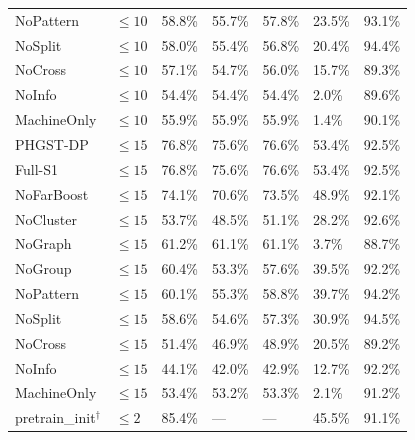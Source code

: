 \begin{table}[p]
\begin{tabularx}{\textwidth}{@{}lXXXXXX@{}}
NoPattern & $\le 10$ & 58.8\% & 55.7\% & 57.8\% & 23.5\% & 93.1\% \\
NoSplit & $\le 10$ & 58.0\% & 55.4\% & 56.8\% & 20.4\% & 94.4\% \\
NoCross & $\le 10$ & 57.1\% & 54.7\% & 56.0\% & 15.7\% & 89.3\% \\
NoInfo & $\le 10$ & 54.4\% & 54.4\% & 54.4\% & 2.0\% & 89.6\% \\
MachineOnly & $\le 10$ & 55.9\% & 55.9\% & 55.9\% & 1.4\% & 90.1\% \\
\midrule
PHGST-DP & $\le 15$ & 76.8\% & 75.6\% & 76.6\% & 53.4\% & 92.5\% \\
Full-S1 & $\le 15$ & 76.8\% & 75.6\% & 76.6\% & 53.4\% & 92.5\% \\
NoFarBoost & $\le 15$ & 74.1\% & 70.6\% & 73.5\% & 48.9\% & 92.1\% \\
NoCluster & $\le 15$ & 53.7\% & 48.5\% & 51.1\% & 28.2\% & 92.6\% \\
NoGraph & $\le 15$ & 61.2\% & 61.1\% & 61.1\% & 3.7\% & 88.7\% \\
NoGroup & $\le 15$ & 60.4\% & 53.3\% & 57.6\% & 39.5\% & 92.2\% \\
NoPattern & $\le 15$ & 60.1\% & 55.3\% & 58.8\% & 39.7\% & 94.2\% \\
NoSplit & $\le 15$ & 58.6\% & 54.6\% & 57.3\% & 30.9\% & 94.5\% \\
NoCross & $\le 15$ & 51.4\% & 46.9\% & 48.9\% & 20.5\% & 89.2\% \\
NoInfo & $\le 15$ & 44.1\% & 42.0\% & 42.9\% & 12.7\% & 92.2\% \\
MachineOnly & $\le 15$ & 53.4\% & 53.2\% & 53.3\% & 2.1\% & 91.2\% \\
\midrule
pretrain\_init$^\dagger$ & $\le 2$ & 85.4\% & --- & --- & 45.5\% & 91.1\% \\
\bottomrule
\end{tabularx}
\end{table}

